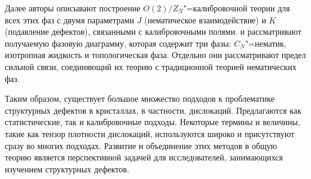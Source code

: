 \documentclass[a4paper, 14pt, titlepage]{extarticle}
\begin{document}
  Далее авторы описывают построение $O(2)/Z_N$"=калибровочной теории для всех этих фаз с двумя
  параметрами $J$ (нематическое взаимодействие) и $K$ (подавление дефектов), связанными с
  калибровочными полями. и рассматривают получаемую фазовую диаграмму, которая содержит три фазы:
  $C_N$"=нематик, изотропная жидкость и топологическая фаза. Отдельно они рассматривают
  предел сильной связи, соединяющий их теорию с традиционной теорией нематических фаз.


  Таким образом, существует большое множество подходов к проблематике структурных дефектов в
  кристаллах, в частности, дислокаций. Предлагаются как статистические, так и калибровочные подходы.
  Некоторые термины и величины, такие как тензор плотности дислокаций, используются широко и
  присутствуют сразу во многих подходах. Развитие и объединение этих методов в общую теорию является
  перспективной задачей для исследователей, занимающихся изучением структурных дефектов.

  \PrintBibliography
\end{document}
